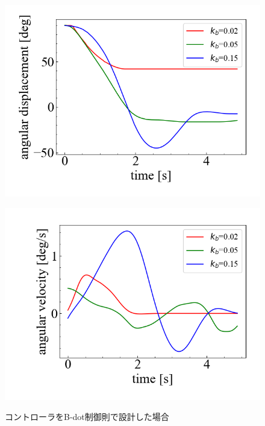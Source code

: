 \begin{figure}[h]
	\centering
	\begin{minipage}{0.45\columnwidth}
	  \centering
	  \includegraphics[width=\columnwidth]{./figure/kb5deg.png}
	  \label{fig:bdotdeg}
	\end{minipage}
	\hspace{5mm}
	\begin{minipage}{0.45\columnwidth}
	  \centering
	  \includegraphics[width=\columnwidth]{./figure/kb5degpers.png}
	  \label{fig:bdotdegpers}
	\end{minipage}
	\caption{コントローラをB-dot制御則で設計した場合}
	\label{fig:bdot}
\end{figure}


